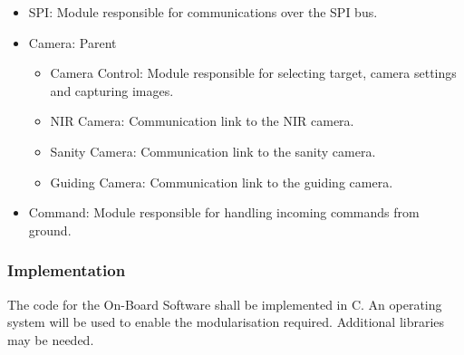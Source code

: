 \begin{itemize}
	\item SPI: Module responsible for communications over the SPI bus.

	\item Camera: Parent
		\begin{itemize}
			\item Camera Control: Module responsible for selecting target, camera settings and capturing images.
			\item NIR Camera: Communication link to the NIR camera.
			\item Sanity Camera: Communication link to the sanity camera.
			\item Guiding Camera: Communication link to the guiding camera.
		\end{itemize}
		
	\item Command: Module responsible for handling incoming commands from ground.
		
\end{itemize}

\subsubsection{Implementation}

The code for the On-Board Software shall be implemented in C. An operating system will be used to enable the modularisation required. Additional libraries may be needed. 

\raggedbottom
